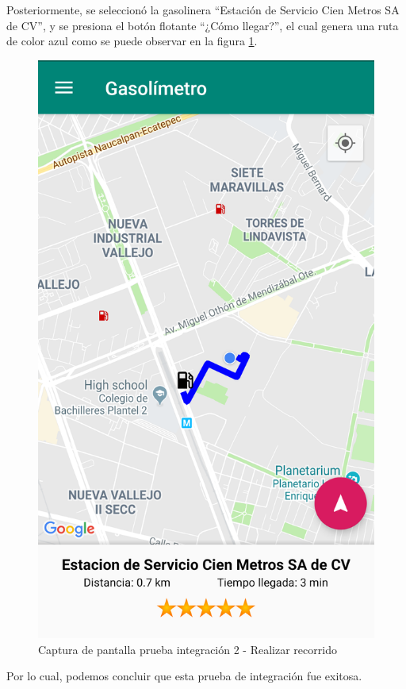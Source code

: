 Posteriormente, se seleccionó la gasolinera ``Estación de Servicio Cien Metros SA de CV'', y se presiona el botón flotante ``¿Cómo llegar?'', el cual genera una ruta de color azul como se puede observar en la figura \ref{fig:int12}.


\begin{figure}[H]
	\centering
	\includegraphics[scale=.2]{Capitulo6/integracion/software/images/12}
	\caption{Captura de pantalla prueba integración 2 - Realizar recorrido}
	\label{fig:int12}
\end{figure}

Por lo cual, podemos concluir que esta prueba de integración fue exitosa.